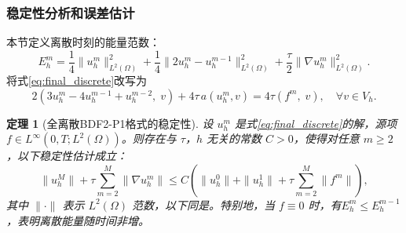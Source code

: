 \documentclass{GZUbachelorthesis}
\theoremstyle{chineseplain}
\newtheorem{theorem}{定理}[section]
\begin{document}
\subsubsection{稳定性分析和误差估计}
本节定义离散时刻的能量范数：
\begin{equation}\label{eq:discrete_energy}
	E_h^m=\frac{1}{4} \| u_h^m \|_{L^2(\Omega)}^2 + \frac{1}{4} \| 2u_h^m - u_h^{m-1} \|_{L^2(\Omega)}^2 + \frac{\tau}{2} \| \nabla u_h^m \|_{L^2(\Omega)}^2.
\end{equation}
将式\eqref{eq:final_discrete}改写为
\begin{equation}
	\label{eq:final_discrete-two}
	2\left ( 3u_h^m - 4u_h^{m-1} + u_h^{m-2},\; v \right) + 4\tau \, a(u_h^m, v) = 4\tau \left(  f^m,\; v \right), \quad \forall v \in V_h.
\end{equation}
\begin{theorem}[全离散BDF2-P1格式的稳定性]\label{thm:quanwend}
	设 $u_h^m$ 是式\eqref{eq:final_discrete}的解，源项 $f \in L^\infty(0,T; L^2(\Omega))$。则存在与 $\tau$，$h$ 无关的常数 $C > 0$，使得对任意 $m \geq2$，以下稳定性估计成立：
	\begin{equation}\label{eq:BDF2_stability_estimate}
		\| u_h^M \| + \tau \sum_{m=2}^M \| \nabla u_h^m \| 
		\leq C \left( \| u_h^0 \| + \| u_h^1 \|+ \tau \sum_{m=2}^M \| f^m \| \right),
	\end{equation}
	其中 $\| \cdot \|$ 表示 $L^2(\Omega)$ 范数，以下同是。特别地，当 $f \equiv 0$ 时，有$E_h^m \leq E_h^{m-1}$，表明离散能量随时间非增。
\end{theorem}
\end{document}
